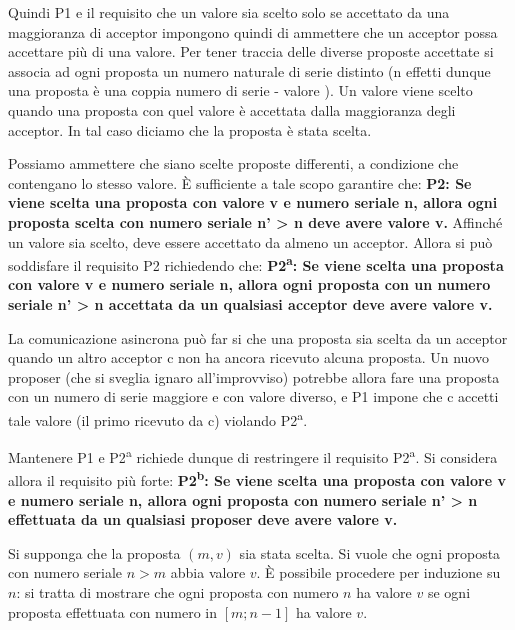 Quindi P1 e il requisito che un valore sia scelto solo se accettato da una maggioranza di acceptor impongono quindi di ammettere che un acceptor possa accettare più di una valore. Per tener traccia delle diverse proposte accettate si associa ad ogni proposta un numero naturale di serie distinto (n effetti dunque una proposta è una coppia numero di serie - valore ). Un valore viene scelto quando una proposta con quel valore è accettata dalla maggioranza degli acceptor. In tal caso diciamo che la proposta è stata scelta.

Possiamo ammettere che siano scelte proposte differenti, a condizione che contengano lo stesso valore. È sufficiente a tale scopo garantire che: \newline
\textbf{P2: Se viene scelta una proposta con valore v e numero seriale n, allora ogni proposta scelta con numero seriale n' > n deve avere valore v.}\newline
Affinché un valore sia scelto, deve essere accettato da almeno un acceptor. Allora si può soddisfare il requisito P2 richiedendo che:\newline
\textbf{P2\textsuperscript{a}: Se viene scelta una proposta con valore v e numero seriale n, allora ogni proposta con un numero seriale n' > n accettata da un qualsiasi acceptor deve avere valore v.}

La comunicazione asincrona può far si che una proposta sia scelta da un acceptor quando un altro acceptor c non ha ancora ricevuto alcuna proposta. Un nuovo proposer (che si sveglia ignaro all'improvviso) potrebbe allora fare una proposta con un numero di serie maggiore e con valore diverso, e P1 impone che c accetti tale valore (il primo ricevuto da c) violando P2\textsuperscript{a}. 

Mantenere P1 e P2\textsuperscript{a} richiede dunque di restringere il requisito P2\textsuperscript{a}. Si considera allora il requisito più forte:\newline
\textbf{P2\textsuperscript{b}: Se viene scelta una proposta con valore v e numero seriale n, allora ogni proposta con numero seriale n' > n effettuata da un qualsiasi proposer deve avere valore v.}

\vspace{5mm}

Si supponga che la proposta $(m, v)$ sia stata scelta. Si vuole che ogni proposta con numero seriale $n > m$ abbia valore $v$. È possibile procedere per induzione su $n$: si tratta di mostrare che ogni proposta con numero $n$ ha valore $v$ se ogni proposta effettuata con numero in $[m;n-1]$ ha valore $v$.

